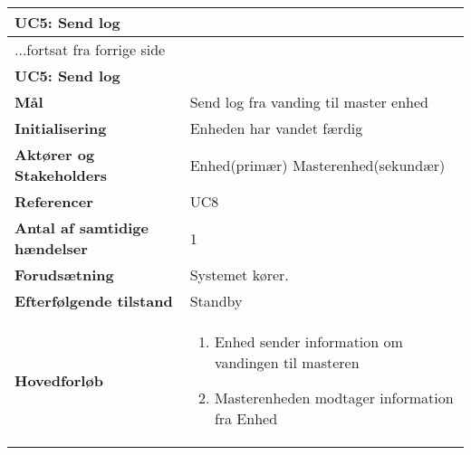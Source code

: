 \begin{center} \centering
	\begin{longtable}{|p{6cm}|p{8cm}|}  %
	\hline
		\multicolumn{2}{|l|}{\textbf{UC5: Send log}} \\\hline %
		\endfirsthead
		
		\multicolumn{2}{l}{...fortsat fra forrige side} \\ \hline %
		\multicolumn{2}{|l|}{\textbf{UC5: Send log}} \\\hline %
		\endhead	
		
		\textbf{Mål}				&Send log fra vanding til master enhed			\\\hline
		\textbf{Initialisering}					&Enheden har vandet færdig			\\\hline
		\textbf{Aktører og Stakeholders}			&Enhed(primær) Masterenhed(sekundær)			\\\hline
		\textbf{Referencer}						&UC8		\\\hline
		\textbf{Antal af samtidige hændelser}	&1			\\\hline
		\textbf{Forudsætning}					&Systemet kører.		\\\hline
		\textbf{Efterfølgende tilstand}			&Standby			\\\hline
		\textbf{Hovedforløb}					
			&\begin{enumerate}
	
				\item Enhed sender information om vandingen til masteren
				
				\item Masterenheden modtager information fra Enhed
	
			\end{enumerate}\\\hline
	\end{longtable}
	\label{UC5} 
\end{center}

